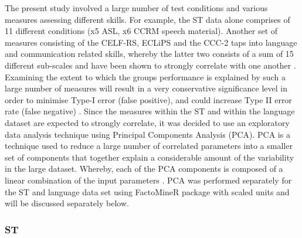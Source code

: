 \documentclass[a4paper, twoside]{templates/ociamthesis}
\begin{document}
The present study involved a large number of test conditions and various measures assessing different skills. For example, the ST data alone comprises of 11 different conditions (x5 ASL, x6 CCRM speech material). Another set of measures consisting of the CELF-RS, ECLiPS and the CCC-2 taps into language and communication related skills, whereby the latter two consists of a sum of 15 different sub-scales and have been shown to strongly correlate with one another \autocite{Barry2014}. Examining the extent to which the groups performance is explained by such a large number of measures will result in a very conservative significance level in order to minimise Type-I error (false positive), and could increase Type II error rate (false negative) \autocite{McDonald2014}. Since the measures within the ST and within the language dataset are expected to strongly correlate, it was decided to use an exploratory data analysis technique using Principal Components Analysis (PCA). PCA is a technique used to reduce a large number of correlated parameters into a smaller set of components that together explain a considerable amount of the variability in the large dataset. Whereby, each of the PCA components is composed of a linear combination of the input parameters \autocite{JamesGareth2013}. PCA was performed separately for the ST and language data set using FactoMineR package \autocite{Le2008} with scaled units and will be discussed separately below.

\hypertarget{st-1}{%
\subsubsection{ST}\label{st-1}}
\end{document}
